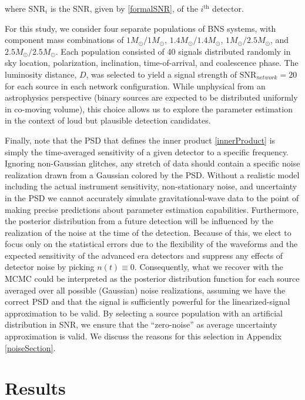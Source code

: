 \documentclass[11pt,a4paper]{emulateapj} 
\begin{document}
\noindent where $\text{SNR}_i$ is the SNR, given by \eqref{formalSNR}, of
the $i^{\text{th}}$ detector.

For this study, we consider four separate populations of BNS systems,
with component mass combinations of $1M_{\odot}/1M_{\odot}$,
$1.4M_{\odot}/1.4M_{\odot}$, $1M_{\odot}/2.5M_{\odot}$, and
$2.5M_{\odot}/2.5M_{\odot}$.  Each population consisted of 40 signals
distributed randomly in sky location, polarization, inclination,
time-of-arrival, and coalescence phase.  The luminosity distance, $D$,
was selected to yield a signal strength of $\text{SNR}_{network}=20$
for each source in each network configuration. 
 While unphysical from an astrophysics perspective
(binary sources are expected to be distributed uniformly in co-moving volume), this
choice allows us to explore the parameter estimation in the context of
loud but plausible detection candidates.

Finally, note that the PSD that defines the inner
product \eqref{innerProduct} is simply the time-averaged sensitivity
of a given detector to a specific frequency.  Ignoring non-Gaussian
glitches, any stretch of data should contain a specific noise
realization drawn from a Gaussian colored by the PSD.  Without a
realistic model including the actual instrument sensitivity, non-stationary
 noise, and uncertainty in the PSD we cannot accurately
simulate gravitational-wave data to the point of making precise predictions about
parameter estimation capabilities.  Furthermore, the posterior
distribution from a future detection will be influenced by the
realization of the noise at the time of the detection.  Because of
this, we elect to focus only on the statistical errors due to the
flexibility of the waveforms and the expected sensitivity of the
advanced era detectors and suppress any effects of detector noise by
picking $n(t) \equiv 0$.  Consequently, what we recover with the MCMC could be interpreted as
the posterior distribution function for each source averaged over all
possible (Gaussian) noise realizations, assuming we have the correct
PSD and that the signal is sufficiently powerful for the linearized-signal
approximation to be valid.  By selecting a source population with an
 artificial distribution in SNR, we ensure that the
     ``zero-noise'' as average uncertainty approximation is valid.
       We discuss the reasons for this selection in Appendix \ref{noiseSection}.

\section{Results}
\label{resultsSection} 
\end{document}
